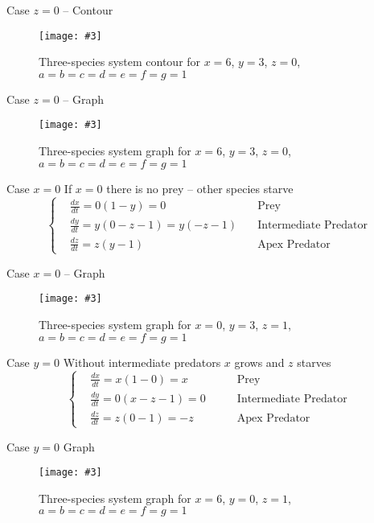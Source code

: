 \documentclass[hyperref={colorlinks,allcolors=black}]{beamer}
\newcommand{\makefig}[4]{
    \begin{figure}[#1]
        \captionsetup{justification=centering}
        \texttt{[image: \#3]}
        \caption{#4}
        \label{fig:#3}
    \end{figure}
}
\begin{document}
\begin{frame}{Case $z=0$ -- Contour}
    \makefig{h}{0.7\textwidth}{3s_z_zero_contour}
        {Three-species system contour for $x=6$, $y=3$, $z=0$, 
        $a=b=c=d=e=f=g=1$}
\end{frame}

\begin{frame}{Case $z=0$ -- Graph}
    \makefig{h}{0.8\textwidth}{3s_z_zero_graph}
        {Three-species system graph for $x=6$, $y=3$, $z=0$, $a=b=c=d=e=f=g=1$}
\end{frame}

\begin{frame}{Case $x=0$}
    If $x=0$ there is no prey -- other species starve
    \begin{equation}\nonumber
        \left\{\begin{aligned}
            &\frac{dx}{dt}=0(1-y)=0              &\text{Prey}\\
            &\frac{dy}{dt}=y(0-z-1)=y(-z-1)\quad &\text{Intermediate Predator}\\
            &\frac{dz}{dt}=z(y-1)                &\text{Apex Predator}
        \end{aligned}\right.
    \end{equation}
\end{frame}

\begin{frame}{Case $x=0$ -- Graph}
    \makefig{h}{0.9\textwidth}{3s_x_zero_graph}
        {Three-species system graph for $x=0$, $y=3$, $z=1$, $a=b=c=d=e=f=g=1$}
\end{frame}

\begin{frame}{Case $y=0$}
    Without intermediate predators $x$ grows and $z$ starves
    \begin{equation}\nonumber
        \left\{\begin{aligned}
            &\frac{dx}{dt}=x(1-0)=x         &\text{Prey}\\
            &\frac{dy}{dt}=0(x-z-1)=0\qquad &\text{Intermediate Predator}\\
            &\frac{dz}{dt}=z(0-1)=-z        &\text{Apex Predator}
        \end{aligned}\right.
    \end{equation}
\end{frame}

\begin{frame}{Case $y=0$ Graph}
\makefig{h}{0.9\textwidth}{3s_y_zero_graph}{Three-species system graph for $x=6$, $y=0$, $z=1$, $a=b=c=d=e=f=g=1$}
\end{frame}
\end{document}
